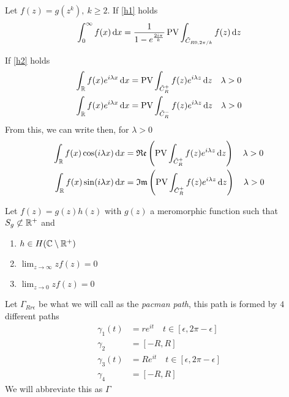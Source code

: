 \documentclass[../complete.tex]{subfiles}
\begin{document}
\begin{thm}
	Let $f(z)=g(z^k),\ k\ge2$. If \eqref{h1} holds
	\begin{equation}
		\int_{0}^{\infty}f(x)\operatorname{d\!} x=\frac{1}{1-e^{\frac{2i\pi}{k}}}\operatorname{\mathrm{PV}}\int_{\tilde{C}_{R0,2\pi/k}}^{}f(z)\operatorname{d\!} z
		\label{eq:powerint}
	\end{equation}
\end{thm}
\begin{thm}
	If \eqref{h2} holds
	\begin{equation}
		\begin{aligned}
			\int_{\mathbb{R}}^{}f(x)e^{i\lambda x}\operatorname{d\!} x&=\operatorname{\mathrm{PV}}\int_{\tilde{C}_R^+}f(z)e^{i\lambda z}\operatorname{d\!} z\quad\lambda>0\\
			\int_{\mathbb{R}}^{}f(x)e^{i\lambda x}\operatorname{d\!} x&=\operatorname{\mathrm{PV}}\int_{\tilde{C}_R^-}f(z)e^{i\lambda z}\operatorname{d\!} z\quad\lambda>0
		\end{aligned}
		\label{eq:fourierint}
	\end{equation}
	From this, we can write then, for $\lambda>0$
	\begin{equation}
		\begin{aligned}
			\int_{\mathbb{R}}^{}f(x)\cos(i\lambda x)\operatorname{d\!} x&=\mathfrak{Re}\left(\operatorname{\mathrm{PV}}\int_{\tilde{C}_R^+}f(z)e^{i\lambda z}\operatorname{d\!} z\right)\quad\lambda>0\\
			\int_{\mathbb{R}}^{}f(x)\sin(i\lambda x)\operatorname{d\!} x&=\mathfrak{Im}\left(\operatorname{\mathrm{PV}}\int_{\tilde{C}_R^+}f(z)e^{i\lambda z}\operatorname{d\!} z\right)\quad\lambda>0\\
		\end{aligned}
		\label{eq:trigpos}
	\end{equation}
\end{thm}
\begin{hyp}
	Let $f(z)=g(z)h(z)$ with $g(z)$ a meromorphic function such that $S_g\not\subset\mathbb{R}^+$ and
	\begin{enumerate}
	\item $h\in H(\mathbb{C}\setminus\mathbb{R}^+)$
	\item $\lim_{z\to\infty}zf(z)=0$
	\item $\lim_{z\to0}zf(z)=0$
	\end{enumerate}
	\label{h3}
\end{hyp}
\begin{dfn}
	Let $\Gamma_{Rr\epsilon}$ be what we will call as the \textit{pacman path}, this path is formed by $4$ different paths\\
	\begin{equation}
		\begin{aligned}
			\gamma_1(t)&=re^{it}\quad t\in[\epsilon,2\pi-\epsilon]\\
			\gamma_2&=[-R,R]\\
			\gamma_3(t)&=Re^{it}\quad t\in[\epsilon,2\pi-\epsilon]\\
			\gamma_4&=[-R,R]
		\end{aligned}
		\label{eq:pacmanpath}
	\end{equation}
	We will abbreviate this as $\Gamma$
\end{dfn}
\end{document}
